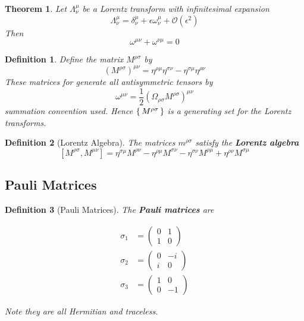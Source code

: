\documentclass{article}
\newtheorem{theorem}{Theorem}[subsection]
\newtheorem{definition}{Definition}[subsection]
\newcommand{\eps}{\epsilon}
\newcommand{\bam}[1]{\textbf{#1}}
\newcommand{\comm}[2][]{\left[ #1, #2 \right]} %
\begin{document}
\begin{theorem}
Let $\Lambda^\mu_\nu$ be a Lorentz transform with infinitesimal expansion 
\[
\Lambda^\mu_\nu=\delta^\mu_\nu+\eps \omega^\mu_\nu +\mathcal{O}(\eps^2) 
\]
Then 
\[
\omega^{\mu\nu}+\omega^{\nu\mu}=0
\]
\end{theorem}

\begin{definition}
Define the matrix $M^{\rho\sigma}$ by 
\[
\left( M^{\rho\sigma} \right)^{\mu\nu} = \eta^{\rho\mu}\eta^{\sigma\nu}-\eta^{\sigma\mu}\eta^{\rho\nu}
\]
These matrices for generate all antisymmetric tensors by \[
\omega^{\mu\nu}=\frac{1}{2}\left(\Omega_{\rho\sigma}M^{\rho\sigma}\right)^{\mu\nu}
\]
summation convention used. Hence $\set{M^{\rho\sigma}}$ is a generating set for the Lorentz transforms. 
\end{definition}

\begin{definition}[Lorentz Algebra]
The matrices $m^{\rho\sigma}$ satisfy the \bam{Lorentz algebra}
\[
\comm[M^{\rho\sigma}]{M^{\mu\nu}}=\eta^{\sigma\mu}M^{\rho\nu}-\eta^{\rho\mu}M^{\sigma\nu}-\eta^{\sigma\nu}M^{\rho\mu}+\eta^{\rho\nu}M^{\sigma\mu}
\]
\end{definition}

\subsection{Pauli Matrices}

\begin{definition}[Pauli Matrices]
The \bam{Pauli matrices} are

\begin{align*}
\sigma_1 &= \begin{pmatrix} 0 & 1 \\ 1 & 0\end{pmatrix}  \\
\sigma_2 &= \begin{pmatrix} 0 & -i \\ i & 0\end{pmatrix}  \\
\sigma_3 &= \begin{pmatrix} 1 & 0 \\ 0 & -1\end{pmatrix}  
\end{align*}

Note they are all Hermitian and traceless.
\end{definition}
\end{document}
